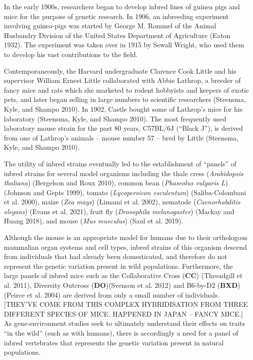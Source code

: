 \documentclass[
]{book}
\begin{document}
In the early 1900s, researchers began to develop inbred lines of guinea pigs and mice for the purpose of genetic research. In 1906, an inbreeding experiment involving guinea-pigs was started by George M. Rommel of the Animal Husbandry Division of the United States Department of Agriculture (Eaton 1932). The experiment was taken over in 1915 by Sewall Wright, who used them to develop his vast contributions to the field.

Contemporaneously, the Harvard undergraduate Clarence Cook Little and his supervisor William Ernest Little collaborated with Abbie Lathrop, a breeder of fancy mice and rats which she marketed to rodent hobbyists and keepers of exotic pets, and later began selling in large numbers to scientific researchers (Steensma, Kyle, and Shampo 2010). In 1902, Castle bought some of Lathrop's mice for his laboratory (Steensma, Kyle, and Shampo 2010). The most frequently used laboratory mouse strain for the past 80 years, C57BL/6J (``Black J''), is derived from one of Lathrop's animals -- mouse number 57 -- bred by Little (Steensma, Kyle, and Shampo 2010).

The utility of inbred strains eventually led to the establishment of ``panels'' of inbred strains for several model organisms including the thale cress (\emph{Arabidopsis thaliana}) (Bergelson and Roux 2010), common bean (\emph{Phaseolus vulgaris L}) (Johnson and Gepts 1999), tomato (\emph{Lycopersicon esculentum}) (Saliba-Colombani et al. 2000), maize (\emph{Zea mays}) (Limami et al. 2002), nematode (\emph{Caenorhabditis elegans}) (Evans et al. 2021), fruit fly (\emph{Drosophila melanogaster}) (Mackay and Huang 2018), and mouse (\emph{Mus musculus}) (Saul et al. 2019).

Although the mouse is an appropriate model for humans due to their orthologous mammalian organ systems and cell types, inbred strains of this organism descend from individuals that had already been domesticated, and therefore do not represent the genetic variation present in wild populations. Furthermore, the large panels of inbred mice such as the Collaborative Cross (\textbf{CC}) (Threadgill et al. 2011), Diversity Outcross (\textbf{DO})(Svenson et al. 2012) and B6-by-D2 (\textbf{BXD})(Peirce et al. 2004) are derived from only a small number of individuals. {[}THEY'VE COME FROM THIS COMPLEX HYBRIDISATION FROM THREE DIFFERENT SPECIES OF MICE. HAPPENED IN JAPAN -- FANCY MICE.{]} As gene-environment studies seek to ultimately understand their effects on traits ``in the wild'' (such as with humans), there is accordingly a need for a panel of inbred vertebrates that represents the genetic variation present in natural populations.
\end{document}
